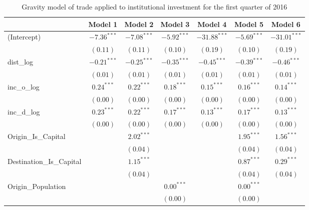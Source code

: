 \begin{table}
	\small
	\caption[CGravity Model of Trade for Q1 2016]{Gravity model of trade applied to institutional investment for the first quarter of 2016}
	\begin{center}
		\begin{tabular}{l c c c c c c }
			\hline
			& Model 1 & Model 2 & Model 3 & Model 4 & Model 5 & Model 6 \\
			\hline
			(Intercept)                  & $-7.36^{***}$ & $-7.08^{***}$ & $-5.92^{***}$ & $-31.88^{***}$ & $-5.69^{***}$ & $-31.01^{***}$ \\
			& $(0.11)$      & $(0.11)$      & $(0.10)$      & $(0.19)$       & $(0.10)$      & $(0.19)$       \\
			dist\_log                    & $-0.21^{***}$ & $-0.25^{***}$ & $-0.35^{***}$ & $-0.45^{***}$  & $-0.39^{***}$ & $-0.46^{***}$  \\
			& $(0.01)$      & $(0.01)$      & $(0.01)$      & $(0.01)$       & $(0.01)$      & $(0.01)$       \\
			inc\_o\_log                  & $0.24^{***}$  & $0.22^{***}$  & $0.18^{***}$  & $0.15^{***}$   & $0.16^{***}$  & $0.14^{***}$   \\
			& $(0.00)$      & $(0.00)$      & $(0.00)$      & $(0.00)$       & $(0.00)$      & $(0.00)$       \\
			inc\_d\_log                  & $0.23^{***}$  & $0.22^{***}$  & $0.17^{***}$  & $0.13^{***}$   & $0.17^{***}$  & $0.13^{***}$   \\
			& $(0.00)$      & $(0.00)$      & $(0.00)$      & $(0.00)$       & $(0.00)$      & $(0.00)$       \\
			Origin\_Is\_Capital          &               & $2.02^{***}$  &               &                & $1.95^{***}$  & $1.56^{***}$   \\
			&               & $(0.04)$      &               &                & $(0.04)$      & $(0.04)$       \\
			Destination\_Is\_Capital     &               & $1.15^{***}$  &               &                & $0.87^{***}$  & $0.29^{***}$   \\
			&               & $(0.04)$      &               &                & $(0.04)$      & $(0.04)$       \\
			Origin\_Population           &               &               & $0.00^{***}$  &                & $0.00^{***}$  &                \\
			&               &               & $(0.00)$      &                & $(0.00)$      &                \\

\end{tabular}
\end{center}
\end{table}
